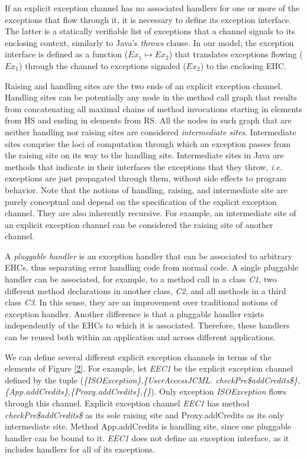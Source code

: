 \documentclass[10pt, conference, compsocconf]{IEEEtran}
\begin{document}
If an explicit exception channel has no associated
handlers for one or more of the exceptions that flow
through it, it is necessary to define its exception interface.
The latter is a statically verifiable list of exceptions that a
channel signals to its enclosing context, similarly to
Java's \textit{throws} clause. In our model, the exception
interface is defined as a function ($Ex_1 \mapsto Ex_2$) that
translates exceptions flowing ($Ex_1$) through the channel to
exceptions signaled ($Ex_2$) to the enclosing EHC.


Raising and handling sites are the two ends of an
explicit exception channel. Handling sites can be
potentially any node in the method call graph that results
from concatenating all maximal chains of method
invocations starting in elements from HS and ending in
elements from RS. All the nodes in such graph that are
neither handling nor raising sites are considered
\textit{intermediate sites}. Intermediate sites comprise the loci of
computation through which an exception passes from the
raising site on its way to the handling site. Intermediate
sites in Java are methods that indicate in their interfaces the exceptions that
they throw, \textit{i.e.} exceptions are just propagated through them, without
side effects to program behavior. Note that the notions of handling, raising, and
intermediate site are purely conceptual and depend on the specification of the
explicit exception channel. They are also inherently recursive. For example, an
intermediate site of an explicit exception channel can be considered the raising
site of another channel.  

A \textit{pluggable handler} is an exception handler that can be associated to
arbitrary EHCs, thus separating error handling code from normal code. A single pluggable
handler can be associated, for example, to a method call in a class \textit{C1},
two different method declarations in another class, \textit{C2}, and all methods in
a third class \textit{C3}. In this sense, they are an improvement over
traditional notions of exception handler. Another difference is that a pluggable handler exists
independently of the EHCs to which it is associated. Therefore, these handlers
can be reused both within an application and across different applications.     

We can define several different explicit exception channels in terms of the
  elements of Figure \ref{2}. For example, let \textit{EEC1} be the explicit
  exception channel defined by the tuple (\textit{\{ISOException\},\{UserAccessJCML.
  checkPre\$addCredits\$\},\{App.addCredits\},\{Proxy.addCredits\},\{\}}). Only
  exception \textit{ISOException} flows through this channel. Explicit exception
  channel \textit{EEC1} has method \textit{checkPre\$addCredits\$} as its sole
  raising site and Proxy.addCredits as its only intermediate site. Method App.addCredits is handling site, since one
  pluggable handler can be bound to it. \textit{EEC1} does not define an
  exception interface, as it includes handlers for all of its exceptions.        
\end{document}
